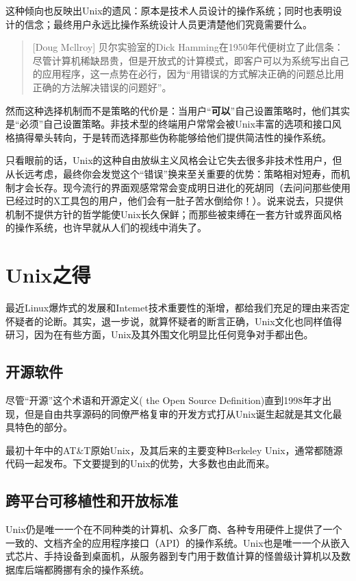 \documentclass[12pt,oneside]{book}
\begin{document}
\begin{common-format}
这种倾向也反映出Unix的遗风：原本是技术人员设计的操作系统；同时也表明设计的信念；最终用户永远比操作系统设计人员更清楚他们究竟需要什么。

\begin{quote}[Doug Mcllroy]
贝尔实验室的Dick Hamming在1950年代便树立了此信条：尽管计算机稀缺昂贵，但是开放式的计算模式，即客户可以为系统写出自己的应用程序，这一点势在必行，因为“用错误的方式解决正确的问题总比用正确的方法解决错误的问题好”。
\end{quote}

然而这种选择机制而不是策略的代价是：当用户“\textbf{可以}”自己设置策略时，他们其实是“必须”自己设置策略。非技术型的终端用户常常会被Unix丰富的选项和接口风格搞得晕头转向，于是转而选择那些伪称能够给他们提供简洁性的操作系统。

只看眼前的话，Unix的这种自由放纵主义风格会让它失去很多非技术性用户，但从长远考虑，最终你会发觉这个“错误”换来至关重要的优势：策略相对短寿，而机制才会长存。现今流行的界面观感常常会变成明日进化的死胡同（去问问那些使用已经过时的X工具包的用户，他们会有一肚子苦水倒给你！）。说来说去，只提供机制不提供方针的哲学能使Unix长久保鲜；而那些被束缚在一套方针或界面风格的操作系统，也许早就从人们的视线中消失了。


\section{Unix之得}
最近Linux爆炸式的发展和Intemet技术重要性的渐增，都给我们充足的理由来否定怀疑者的论断。其实，退一步说，就算怀疑者的断言正确，Unix文化也同样值得研习，因为在有些方面，Unix及其外围文化明显比任何竞争对手都出色。

\subsection{开源软件}
尽管“开源”这个术语和开源定义( the Open Source Definition)直到1998年才出现，但是自由共享源码的同僚严格复审的开发方式打从Unix诞生起就是其文化最具特色的部分。

最初十年中的AT\&{}T原始Unix，及其后来的主要变种Berkeley Unix，通常都随源代码一起发布。下文要提到的Unix的优势，大多数也由此而来。

\subsection{跨平台可移植性和开放标准}
Unix仍是唯一一个在不同种类的计算机、众多厂商、各种专用硬件上提供了一个一致的、文档齐全的应用程序接口（API）的操作系统。Unix也是唯一一个从嵌入式芯片、手持设备到桌面机，从服务器到专门用于数值计算的怪兽级计算机以及数据库后端都腾挪有余的操作系统。


\end{common-format}
\end{document}

